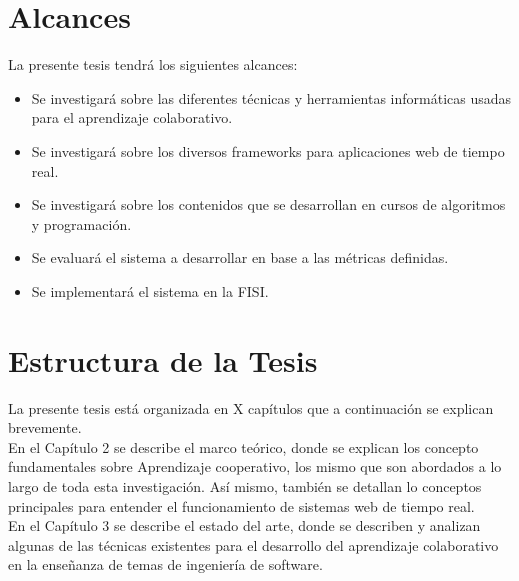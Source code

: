 \section{Alcances}
La presente tesis tendrá los siguientes alcances:
\begin{itemize}
  \item Se investigará sobre las diferentes técnicas y herramientas informáticas usadas para el aprendizaje colaborativo.
  \item Se investigará sobre los diversos frameworks para aplicaciones web de tiempo real.
  \item Se investigará sobre los contenidos que se desarrollan en cursos de algoritmos y programación.
  \item Se evaluará el sistema a desarrollar en base a las métricas definidas.
  \item Se implementará el sistema en la FISI.
\end{itemize}

\section{Estructura de la Tesis}
La presente tesis está organizada en X capítulos que a continuación se explican brevemente.\\

En el Capítulo 2 se describe el marco teórico, donde se explican los concepto fundamentales sobre Aprendizaje cooperativo, los mismo que son abordados a lo largo de toda esta investigación. Así mismo, también se detallan lo conceptos principales para entender el funcionamiento de sistemas web de tiempo real.\\

En el Capítulo 3 se describe el estado del arte, donde se describen y analizan algunas de las técnicas existentes para el desarrollo del aprendizaje colaborativo en la enseñanza de temas de ingeniería de software.

